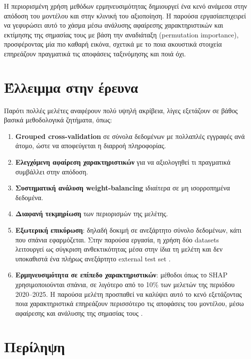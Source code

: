 Η περιορισμένη χρήση μεθόδων ερμηνευσιμότητας δημιουργεί ένα κενό ανάμεσα στην απόδοση του μοντέλου και στην κλινική του αξιοποίηση. 
Η παρούσα εργασίαεπιχειρεί να γεφυρώσει αυτό το χάσμα μέσω ανάλυσης αφαίρεσης χαρακτηριστικών και εκτίμησης της σημασίας τους με βάση την αναδιάταξη (permutation importance), 
προσφέροντας μία πιο καθαρή εικόνα, σχετικά με το ποια ακουστικά στοιχεία επηρεάζουν πραγματικά τις αποφάσεις ταξινόμησης και ποιά όχι.

\section{Έλλειμμα στην έρευνα}

Παρότι πολλές μελέτες αναφέρουν πολύ υψηλή ακρίβεια, λίγες εξετάζουν σε βάθος βασικά μεθοδολογικά ζητήματα, όπως:

\begin{enumerate}
    \item \textbf{Grouped cross-validation} σε σύνολα δεδομένων με πολλαπλές εγγραφές ανά άτομο, ώστε να αποφεύγεται η διαρροή πληροφορίας.
    \item \textbf{Ελεγχόμενη αφαίρεση χαρακτηριστικών} για να αξιολογηθεί τι πραγματικά συμβάλλει στην απόδοση.
    \item \textbf{Συστηματική ανάλυση weight-balancing} ιδιαίτερα σε μη ισορροπημένα δεδομένα.
    \item \textbf{Διαφανή τεκμηρίωση} των περιορισμών της μελέτης.
    \item \textbf{Εξωτερική επικύρωση}: δηλαδή δοκιμή σε ανεξάρτητο σύνολο δεδομένων, κάτι που σπάνια εφαρμόζεται. Στην παρούσα εργασία, η χρήση δύο datasets λειτουργεί ως σύγκριση ανθεκτικότητας μέσα στην ίδια τη μελέτη και δεν υποκαθιστά ένα πλήρως ανεξάρτητο external test set \citep{sedigh_malekroodi2025voice}.
    \item \textbf{Ερμηνευσιμότητα σε επίπεδο χαρακτηριστικών}: μέθοδοι όπως το SHAP χρησιμοποιούνται σπάνια, σε λιγότερο από το 10\% των μελετών της περιόδου 2020--2025. Η παρούσα μελέτη προσπαθεί να καλύψει αυτό το κενό εξετάζοντας ποια χαρακτηριστικά επηρεάζουν περισσότερο τις αποφάσεις του μοντέλου, μέσω αφαίρεσης και ανάλυσης της σημασίας τους \citep{sedigh_malekroodi2025voice}.
\end{enumerate}

\section{Περίληψη}

